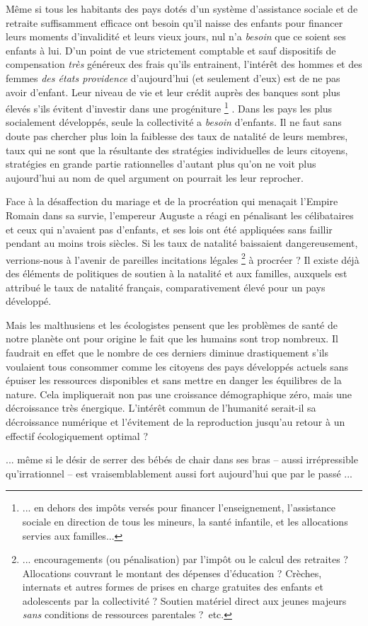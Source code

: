  Même si tous les habitants des pays dotés d'un système d'assistance sociale et de retraite suffisamment efficace ont besoin qu'il naisse des enfants pour financer leurs moments d'invalidité et leurs vieux jours, nul n'a \emph{besoin} que ce soient ses enfants à lui. D'un point de vue strictement comptable et sauf dispositifs de compensation \emph{très}  généreux des frais qu'ils entrainent, l'intérêt des hommes et des femmes \emph{des états providence} d'aujourd'hui (et seulement d'eux) est de ne pas avoir d'enfant. Leur niveau de vie et leur crédit auprès des banques sont plus élevés s'ils évitent d'investir dans une progéniture%
\footnote{... en dehors des impôts versés pour financer l'enseignement, l'assistance sociale en direction de tous les mineurs, la santé infantile, et les allocations servies aux familles...}%
. Dans les pays les plus socialement développés, seule la collectivité a \emph{besoin} d'enfants. Il ne faut sans doute pas chercher plus loin la faiblesse des taux de natalité de leurs membres, taux qui ne sont que la résultante des stratégies individuelles de leurs citoyens, stratégies en grande partie rationnelles d'autant plus qu'on ne voit plus aujourd'hui au nom de quel argument on pourrait les leur reprocher. 
 
 Face à la désaffection du mariage et de la procréation qui menaçait l'Empire Romain dans sa survie, l'empereur Auguste a réagi en pénalisant les célibataires et ceux qui n'avaient pas d'enfants, et ses lois ont été appliquées sans faillir pendant au moins trois siècles. Si les taux de natalité baissaient dangereusement, verrions-nous à l'avenir de pareilles incitations légales%
\footnote{... encouragements (ou pénalisation) par l'impôt ou le calcul des retraites ? Allocations couvrant le montant des dépenses d'éducation ? Crèches, internats et autres formes de prises en charge gratuites des enfants et adolescents par la collectivité ? Soutien matériel direct aux jeunes majeurs \emph{sans} conditions de ressources parentales ?~etc.} 
à procréer ? Il existe déjà des éléments de politiques de soutien à la natalité et aux familles, auxquels est attribué le taux de natalité français, comparativement élevé pour un pays développé.
 
 Mais les malthusiens et les écologistes pensent que les problèmes de santé de notre planète ont pour origine le fait que les humains sont trop nombreux. Il faudrait en effet que le nombre de ces derniers diminue drastiquement s'ils voulaient tous consommer comme les citoyens des pays développés actuels sans épuiser les ressources disponibles et sans mettre en danger les équilibres de la nature. Cela impliquerait non pas une croissance démographique zéro, mais une décroissance très énergique. L'intérêt commun de l'humanité serait-il sa décroissance numérique et l'évitement de la reproduction jusqu'au retour à un effectif écologiquement optimal ? 
 
 ... même si le désir de serrer des bébés de chair dans ses bras -- aussi irrépressible qu'irrationnel -- est vraisemblablement aussi fort aujourd'hui que par le passé ...
 
 
 